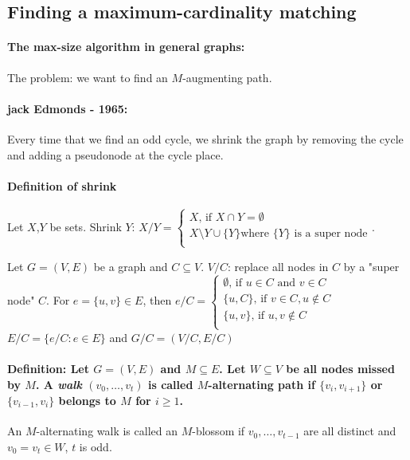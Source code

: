 \documentclass[main]{subfiles}
\begin{document}
\subsection{Finding a maximum-cardinality matching}

\paragraph{The max-size algorithm in general graphs:}
The problem: we want to find an $M$-augmenting path.

\paragraph{jack Edmonds - 1965:} Every time that we find an odd cycle, we
shrink the graph by removing the cycle and adding a pseudonode at the cycle
place.

\paragraph{Definition of shrink} Let $X$,$Y$ be sets.
Shrink $Y$: $X/Y =
\begin{cases}
  X\text{, if } X \cap Y = \emptyset\\
  X \setminus Y \cup \{Y\} \text{where $\{Y\}$ is a super node} \\
\end{cases}$.

Let $G=(V,E)$ be a graph and $C \subseteq V$. $V/C$: replace all nodes in $C$
by a "super node" $C$.
For $e =\{u,v\} \in E$, then $e/C =
\begin{cases}
  \emptyset \text{, if } u \in C \text{ and } v \in C \\
  \{u,C\} \text{, if } v \in C, u \notin C \\
  \{u,v\} \text{, if } u,v \notin C\\
\end{cases}$\\
$E/C = \{ e/C: e \in E\}$ and $G/C = (V/C, E/C)$

\paragraph{Definition: Let $G=(V,E)$ and $M \subseteq E$. Let $W \subseteq V$
be all nodes missed by $M$. A \emph{walk} $(v_0, \dots, v_t)$ is called
$M$-alternating path if $\{v_i, v_{i+1}\}$ or $\{v_{i-1}, v_i\}$ belongs to
$M$ for $i \geq 1$.}

An $M$-alternating walk is called an $M$-blossom if $v_0, \dots, v_{t-1}$ are
all distinct and $v_0 = v_t \in W$, $t$ is odd.
\end{document}
